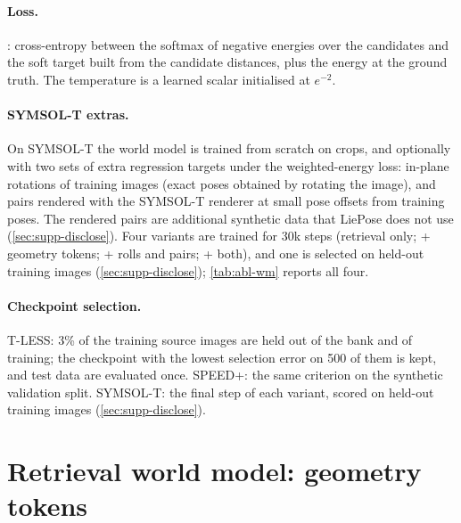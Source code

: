 \paragraph{Loss.}
: cross-entropy between the softmax of negative energies over the candidates and the soft target built from the
candidate distances, plus the energy at the ground truth. The temperature is a learned scalar initialised at $e^{-2}$.

\paragraph{SYMSOL-T extras.}
On SYMSOL-T the world model is trained from scratch on crops, and optionally with two sets of extra regression targets under the
weighted-energy loss: in-plane rotations of training images (exact poses obtained by rotating the image), and pairs rendered with the
SYMSOL-T renderer at small pose offsets from training poses. The rendered pairs are additional synthetic data that LiePose does not use
(\cref{sec:supp-disclose}). Four variants are trained for 30k steps (retrieval only; + geometry tokens; + rolls and pairs; + both),
and one is selected on held-out training images (\cref{sec:supp-disclose}); \cref{tab:abl-wm} reports all four.

\paragraph{Checkpoint selection.}
T-LESS: 3\% of the training source images are held out of the bank and of training; the checkpoint with the lowest selection error on
500 of them is kept, and test data are evaluated once. SPEED+: the same criterion on the synthetic validation split. SYMSOL-T: the final
step of each variant, scored on held-out training images (\cref{sec:supp-disclose}).

\section{Retrieval world model: geometry tokens}
\label{sec:supp-geo}

